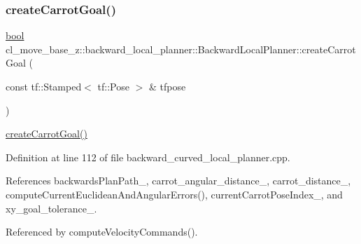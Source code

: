 \subsubsection{\texorpdfstring{create\+Carrot\+Goal()}{createCarrotGoal()}}
{\footnotesize\ttfamily \hyperlink{classbool}{bool} cl\+\_\+move\+\_\+base\+\_\+z\+::backward\+\_\+local\+\_\+planner\+::\+Backward\+Local\+Planner\+::create\+Carrot\+Goal (\begin{DoxyParamCaption}\item[{const tf\+::\+Stamped$<$ tf\+::\+Pose $>$ \&}]{tfpose }\end{DoxyParamCaption})\hspace{0.3cm}{\ttfamily [private]}}

\hyperlink{classcl__move__base__z_1_1backward__local__planner_1_1BackwardLocalPlanner_a786337a838e58b38b724bc342cf76e10}{create\+Carrot\+Goal()} 

Definition at line 112 of file backward\+\_\+curved\+\_\+local\+\_\+planner.\+cpp.



References backwards\+Plan\+Path\+\_\+, carrot\+\_\+angular\+\_\+distance\+\_\+, carrot\+\_\+distance\+\_\+, compute\+Current\+Euclidean\+And\+Angular\+Errors(), current\+Carrot\+Pose\+Index\+\_\+, and xy\+\_\+goal\+\_\+tolerance\+\_\+.



Referenced by compute\+Velocity\+Commands().


